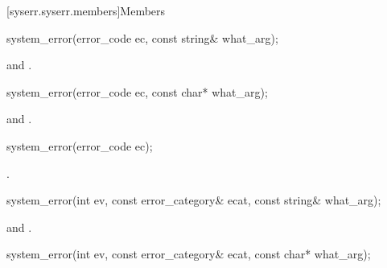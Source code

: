 [syserr.syserr.members]{Members}

%
\begin{itemdecl}
system_error(error_code ec, const string& what_arg);
\end{itemdecl}

\begin{itemdescr}
\pnum
{}

\pnum
\ensures {} and
.
\end{itemdescr}

%
\begin{itemdecl}
system_error(error_code ec, const char* what_arg);
\end{itemdecl}

\begin{itemdescr}
\pnum
{}

\pnum
\ensures {} and
.
\end{itemdescr}

%
\begin{itemdecl}
system_error(error_code ec);
\end{itemdecl}

\begin{itemdescr}
\pnum
{}

\pnum
\ensures {}.
\end{itemdescr}

%
\begin{itemdecl}
system_error(int ev, const error_category& ecat, const string& what_arg);
\end{itemdecl}

\begin{itemdescr}
\pnum
{}

\pnum
\ensures \raggedright {} and\linebreak
{}.
\end{itemdescr}

%
\begin{itemdecl}
system_error(int ev, const error_category& ecat, const char* what_arg);
\end{itemdecl}

